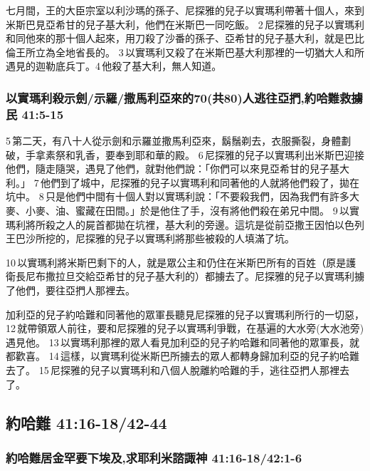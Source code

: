 七月間，王的大臣宗室以利沙瑪的孫子、尼探雅的兒子以實瑪利帶著十個人，來到米斯巴見亞希甘的兒子基大利，他們在米斯巴一同吃飯。 2 尼探雅的兒子以實瑪利和同他來的那十個人起來，用刀殺了沙番的孫子、亞希甘的兒子基大利，就是巴比倫王所立為全地省長的。 3 以實瑪利又殺了在米斯巴基大利那裡的一切猶大人和所遇見的迦勒底兵丁。4 他殺了基大利，無人知道。

\subsubsection{以實瑪利殺示劍/示羅/撒馬利亞來的70(共80)人逃往亞捫,約哈難救擄民 41:5-15}
 5 第二天，有八十人從示劍和示羅並撒馬利亞來，鬍鬚剃去，衣服撕裂，身體劃破，手拿素祭和乳香，要奉到耶和華的殿。 6 尼探雅的兒子以實瑪利出米斯巴迎接他們，隨走隨哭，遇見了他們，就對他們說：「你們可以來見亞希甘的兒子基大利。」 7 他們到了城中，尼探雅的兒子以實瑪利和同著他的人就將他們殺了，拋在坑中。 8 只是他們中間有十個人對以實瑪利說：「不要殺我們，因為我們有許多大麥、小麥、油、蜜藏在田間。」於是他住了手，沒有將他們殺在弟兄中間。 9 以實瑪利將所殺之人的屍首都拋在坑裡，基大利的旁邊。這坑是從前亞撒王因怕以色列王巴沙所挖的，尼探雅的兒子以實瑪利將那些被殺的人填滿了坑。 

10 以實瑪利將米斯巴剩下的人，就是眾公主和仍住在米斯巴所有的百姓（原是護衛長尼布撒拉旦交給亞希甘的兒子基大利的）都擄去了。尼探雅的兒子以實瑪利擄了他們，要往亞捫人那裡去。

加利亞的兒子約哈難和同著他的眾軍長聽見尼探雅的兒子以實瑪利所行的一切惡， 12 就帶領眾人前往，要和尼探雅的兒子以實瑪利爭戰，在基遍的大水旁(大水池旁)遇見他。 13 以實瑪利那裡的眾人看見加利亞的兒子約哈難和同著他的眾軍長，就都歡喜。 14 這樣，以實瑪利從米斯巴所擄去的眾人都轉身歸加利亞的兒子約哈難去了。 15 尼探雅的兒子以實瑪利和八個人脫離約哈難的手，逃往亞捫人那裡去了。

\subsection{約哈難 41:16-18/42-44}
\subsubsection{約哈難居金罕要下埃及,求耶利米諮諏神 41:16-18/42:1-6}


